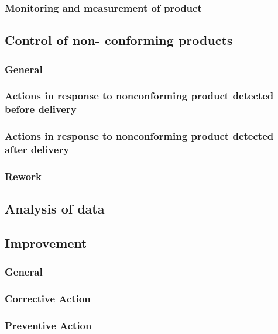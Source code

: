 \documentclass{article}
\begin{document}
\subsubsection{Monitoring and measurement of product}
\subsection{Control of non- conforming products}
\subsubsection{General}
\subsubsection{Actions in response to nonconforming product detected before delivery}
\subsubsection{Actions in response to nonconforming product detected after delivery}
\subsubsection{Rework}
\subsection{Analysis of data}
\subsection{Improvement}
\subsubsection{General}
\subsubsection{Corrective Action}
\subsubsection{Preventive Action}
\end{document}
